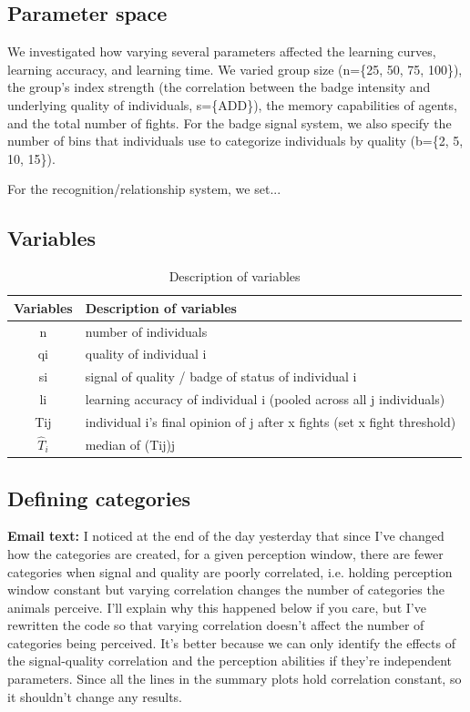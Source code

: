 \subsection*{Parameter space}
We investigated how varying several parameters affected the learning curves, learning accuracy, and learning time. We varied group size (n=\{25, 50, 75, 100\}), the group's index strength (the correlation between the badge intensity and underlying quality of individuals, s=\{ADD\}), the memory capabilities of agents, and the total number of fights. For the badge signal system, we also specify the number of bins that individuals use to categorize individuals by quality (b=\{2, 5, 10, 15\}). 

For the recognition/relationship system, we set...%


\subsection*{Variables}

\begin {table}[h]
\caption {Description of variables} \label{tab:vars} 
\begin{tabular}{cl}
\toprule
 Variables & Description of variables \\
\midrule
n & number of individuals \\ 
 qi & quality of individual i \\ 
 si & signal of quality / badge of status of individual i \\ 
 li & learning accuracy of individual i (pooled across all j individuals) \\
 Tij & individual i's final opinion of j after x fights (set x fight threshold) \\
 $\hat{T}_i$ & median of (Tij)j \\
 
\bottomrule
\end{tabular}
\end {table}

\subsection*{Defining categories}
\textbf{Email text: }I noticed at the end of the day yesterday that since I've changed how the categories are created, for a given perception window, there are fewer categories when signal and quality are poorly correlated, i.e. holding perception window constant but varying correlation changes the number of categories the animals perceive. I'll explain why this happened below if you care, but I've rewritten the code so that varying correlation doesn't affect the number of categories being perceived. It's better because we can only identify the effects of the signal-quality correlation and the perception abilities if they're independent parameters. Since all the lines in the summary plots hold correlation constant, so it shouldn't change any results. 

